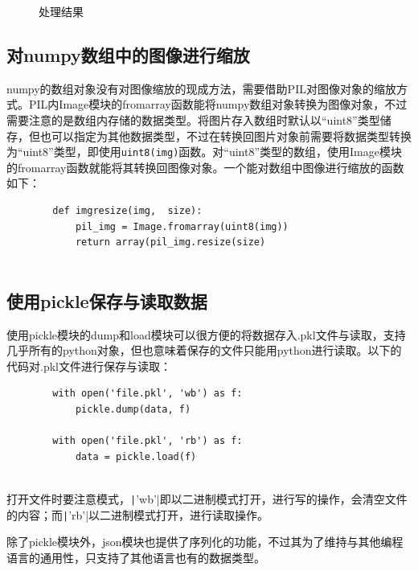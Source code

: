 \documentclass[fontset=ubuntu]{ctexart}
\begin{document}
\begin{figure}[htb]
    \centering
    \caption{处理结果}
    \label{outline_histogram}
\end{figure}

\subsection{对numpy数组中的图像进行缩放}
numpy的数组对象没有对图像缩放的现成方法，需要借助PIL对图像对象的缩放方式。PIL内Image模块的fromarray函数能将numpy数组对象转换为图像对象，不过需要注意的是数组内存储的数据类型。将图片存入数组时默认以“uint8”类型储存，但也可以指定为其他数据类型，不过在转换回图片对象前需要将数据类型转换为“uint8”类型，即使用\verb|uint8(img)|函数。对“uint8”类型的数组，使用Image模块的fromarray函数就能将其转换回图像对象。一个能对数组中图像进行缩放的函数如下：
\begin{listing}[htb]
    \begin{verbatim}
        def imgresize(img,  size):
            pil_img = Image.fromarray(uint8(img))
            return array(pil_img.resize(size)
            
    \end{verbatim}
\end{listing}

\subsection{使用pickle保存与读取数据}
使用pickle模块的dump和load模块可以很方便的将数据存入.pkl文件与读取，支持几乎所有的python对象，但也意味着保存的文件只能用python进行读取。以下的代码对.pkl文件进行保存与读取：
\begin{listing}[htb]
    \begin{verbatim}
        with open('file.pkl', 'wb') as f:
            pickle.dump(data, f)

        with open('file.pkl', 'rb') as f:
            data = pickle.load(f)
            
    \end{verbatim}
\end{listing}

打开文件时要注意模式，\texttt|'wb'|即以二进制模式打开，进行写的操作，会清空文件的内容；而\texttt|'rb'|以二进制模式打开，进行读取操作。

除了pickle模块外，json模块也提供了序列化的功能，不过其为了维持与其他编程语言的通用性，只支持了其他语言也有的数据类型。
\end{document}
